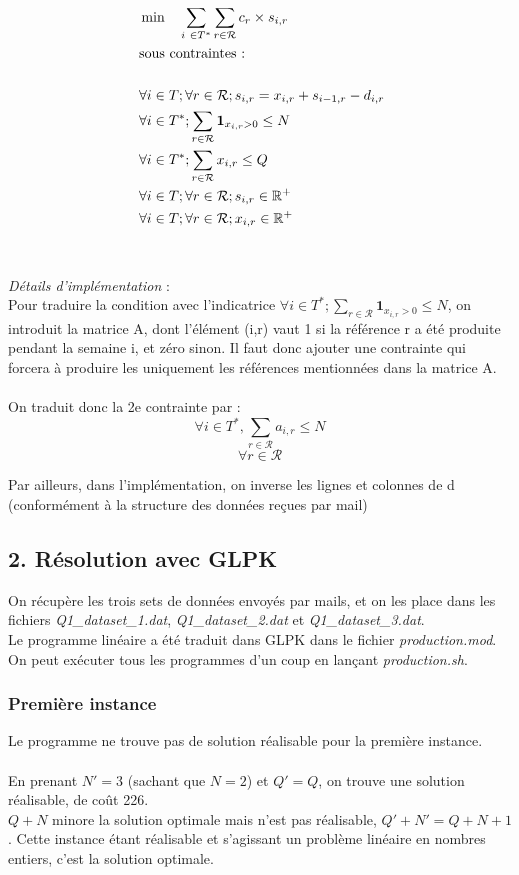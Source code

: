 \documentclass{rapport}
\begin{document}
\begin{equation*}
\begin{aligned}
& \min \ \ \  \sum_{i \in T^*} \sum_{r \in \mathcal{R}} c_r \times s_{i, r} \\
& \text{sous contraintes : } \\
\ \\
& \forall i \in T; \forall r \in \mathcal{R}; s_{i,r} = x_{i,r} + s_{i-1,r} - d_{i, r}\\
& \forall i \in T^*; \sum_{r \in \mathcal{R}} \mathbf{1}_{x_{i, r} > 0} \le N \\
& \forall i \in T^*; \sum_{r \in \mathcal{R}} x_{i, r} \le Q \\
& \forall i \in T; \forall r \in \mathcal{R}; s_{i, r} \in \R^+ \\
& \forall i \in T; \forall r \in \mathcal{R}; x_{i, r} \in \R^+
\end{aligned}
\end{equation*}
\ \\
\ \\
\emph{Détails d'implémentation} : \\
Pour traduire la condition avec l'indicatrice $\forall i \in T^*; \sum_{r \in \mathcal{R}} \mathbf{1}_{x_{i, r} > 0} \le N$, on introduit la matrice A, dont l'élément (i,r) vaut 1 si la référence r a été produite pendant la semaine i, et zéro sinon. Il faut donc ajouter une contrainte qui forcera à produire les uniquement les références mentionnées dans la matrice A. \\
\ \\
On traduit donc la 2e contrainte par :
$$\forall i \in T^*, \sum_{r \in \mathcal{R}}a_{i,r} \le N $$
$$\forall r \in \mathcal{R} $$

Par ailleurs, dans l'implémentation, on inverse les lignes et colonnes de d (conformément à la structure des données reçues par mail)

\subsection{2. Résolution avec GLPK}
On récupère les trois sets de données envoyés par mails, et on les place dans les fichiers \emph{Q1\_dataset\_1.dat}, \emph{Q1\_dataset\_2.dat} et \emph{Q1\_dataset\_3.dat}. \\
Le programme linéaire a été traduit dans GLPK dans le fichier \emph{production.mod}. On peut exécuter tous les programmes d'un coup en lançant \emph{production.sh}.
\ \\
\subsubsection{Première instance}
Le programme ne trouve pas de solution réalisable pour la première instance. \ \\
\ \\
En prenant $N'=3$ (sachant que $N=2$) et $Q'=Q$, on trouve une solution réalisable, de coût 226. \\
$Q+N$ minore la solution optimale mais n'est pas réalisable, $Q'+N'=Q+N+1$. Cette instance étant réalisable et s'agissant un problème linéaire en nombres entiers, c'est la solution optimale. \\
\end{document}
